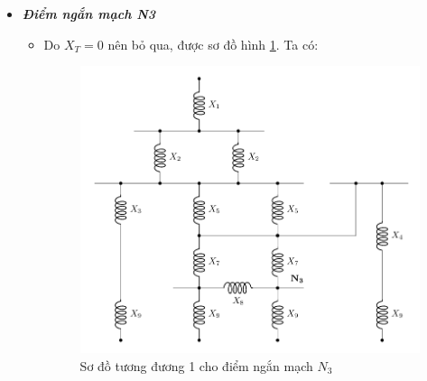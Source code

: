 \documentclass[12pt,a4paper]{article}
\begin{document}
\begin{itemize}
\begin{itemize}
			\newpage
			\item \textbf{\textit{Điểm ngắn mạch N3}}
				\begin{itemize}
					\item Do $X_T = 0 $ nên bỏ qua, được sơ đồ hình \ref{Fig:sodo-tuongduong-bt1-N3-1}. Ta có:
					\begin{figure}[!h]
						\begin{center}
							\includegraphics[scale=1]{figure-baitap-nganmach-1-N3-1.pdf} 
						\end{center}
					\caption{Sơ đồ tương đương 1 cho điểm ngắn mạch $N_3$} \label{Fig:sodo-tuongduong-bt1-N3-1}
					\end{figure}
					
\end{itemize}
\end{itemize}
\end{itemize}
\end{document}
